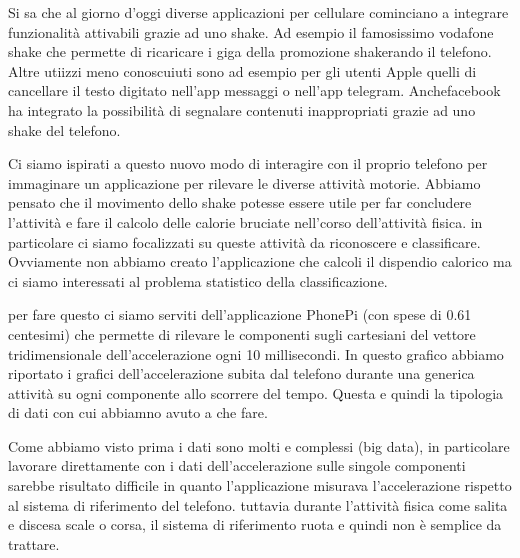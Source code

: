 %
Si sa che al giorno d\rq{}oggi diverse applicazioni per cellulare cominciano a integrare funzionalità attivabili grazie ad uno shake. Ad esempio il famosissimo vodafone shake che permette di ricaricare i giga della promozione shakerando il telefono. Altre utiizzi meno conoscuiuti sono ad esempio per gli utenti Apple quelli di cancellare il testo digitato nell\rq{}app messaggi o nell\rq{}app telegram. Anchefacebook ha integrato la 
possibilità di segnalare contenuti inappropriati grazie ad uno shake del telefono.
%

%
Ci siamo ispirati a questo nuovo modo di interagire con il proprio telefono per immaginare un applicazione per rilevare le diverse attività motorie. Abbiamo pensato che il movimento dello shake potesse essere utile per far concludere l\rq{}attività e fare il calcolo delle calorie bruciate nell\rq{}corso dell\rq{}attività fisica.
in particolare ci siamo focalizzati su queste attività da riconoscere e classificare.
Ovviamente non abbiamo creato l\rq{}applicazione che calcoli il dispendio calorico ma ci siamo interessati al problema statistico della classificazione. 
%

%
per fare questo ci siamo serviti dell\rq{}applicazione PhonePi (con spese di 0.61 centesimi)  che permette di rilevare le componenti sugli cartesiani del vettore tridimensionale dell\rq{}accelerazione ogni 10 millisecondi.
In questo grafico abbiamo riportato i grafici dell\rq{}accelerazione subita dal telefono durante una generica attività su ogni componente allo scorrere del tempo. 
Questa e quindi la tipologia di dati con cui abbiamno avuto a che fare. 
%

%
Come abbiamo visto prima i dati sono molti e complessi (big data), in particolare lavorare direttamente con i dati dell\rq{}accelerazione sulle singole componenti sarebbe risultato difficile in quanto l\rq{}applicazione misurava l\rq{}accelerazione rispetto al sistema di riferimento del telefono. tuttavia durante l\rq{}attività fisica come salita e discesa scale o corsa, il sistema di riferimento ruota e quindi non è semplice da trattare.
%

